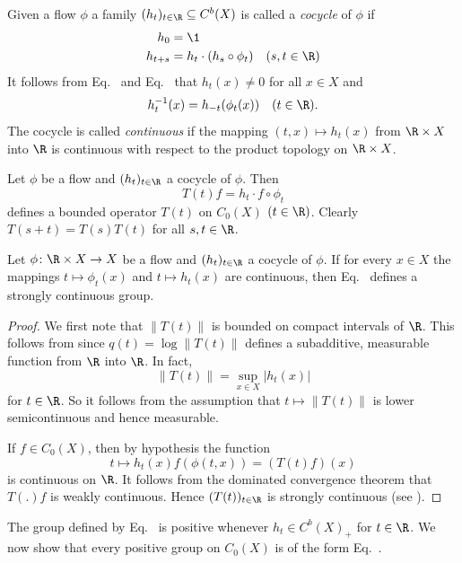 Given a flow $\phi$ a family $(h_{t})_{t \in \R} \subseteq C^{b}(X)$ is called a \emph{cocycle} of\/ $\phi$ if
\begin{align}
h_{0} &= \1 \label{eq:b2-3.10} \\
h_{t+s} &= h_{t} \cdot (h_{s} \circ \phi_{t}) \quad (s,t \in \R) \label{eq:b2-3.11}
\end{align}
It follows from Eq.~ and Eq.~ that $h_{t}(x) \neq 0$ for all $x \in X$ and 
%
\[
	h_{t}^{-1}(x) = h_{-t}(\phi_{t}(x)) \quad (t \in \R).
\]
%
The cocycle is called \emph{continuous} if the mapping $(t,x) \mapsto h_{t}(x)$ from $\R \times X$ into $\R$ is continuous with respect to the product topology on $\R \times X$.

Let $\phi$ be a flow and $(h_{t})_{t \in \R}$ a cocycle of\/ $\phi$.
Then
\begin{equation}\label{eq:b2-3.12}
T(t)f = h_{t} \cdot f \circ \phi_{t}
\end{equation}
defines a bounded operator $T(t)$ on $C_{0}(X)$ $(t \in \R)$.
Clearly $T(s+t) = T(s)T(t)$ for all $s,t \in \R$.
\begin{proposition}\label{prop:b2-3.8}
Let $\phi \colon \R \times X \to X$ be a flow and $(h_{t})_{t \in \R}$ a cocycle of\/ $\phi$.
If for every $x \in X$ the mappings $t \mapsto \phi_{t}(x)$ and $t \mapsto h_{t}(x)$ are continuous, then Eq.~ defines a strongly continuous group.
\end{proposition}
\begin{proof}
We first note that $\|T(t)\|$ is bounded on compact intervals of\/ $\R$.
This follows from \textcite[7.4.1]{hillephillips:1957} since $q(t) = \log\|T(t)\|$ defines a subadditive, measurable function from $\R$ into $\R$.
In fact, 
%
\[
	\|T(t)\| = \sup_{x \in X}|h_{t}(x)|
\]
%
for $t \in \R$.
So it follows from the assumption that $t \mapsto \|T(t)\|$ is lower semicontinuous and hence measurable.

If\/ $f \in C_{0}(X)$, then by hypothesis the function
%
\[
	t \mapsto h_{t}(x) f(\phi(t,x)) = (T(t) f) (x)
\]
%
is continuous on $\R$.
It follows from the dominated convergence theorem that $T(.)f$ is weakly continuous.
Hence $(T(t))_{t \in \R}$ is strongly continuous (see \eg \textcite[Proposition  1.23]{davies:1980}).
\end{proof}
The group defined by Eq.~ is positive whenever %
$ h_{t} \in  C^{b}(X)_{+}$ for $ t \in \R$.
We now show that every positive group on $C_0(X)$ is of the form Eq.~.
